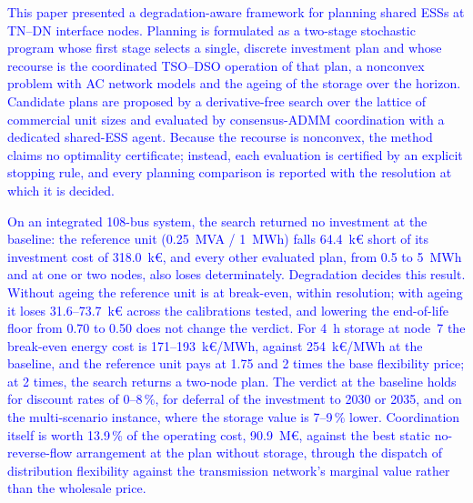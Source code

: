 \textcolor{blue}{
    This paper presented a degradation-aware framework for planning shared ESSs at TN--DN interface nodes. Planning is formulated as a two-stage stochastic program whose first stage selects a single, discrete investment plan and whose recourse is the coordinated TSO--DSO operation of that plan, a nonconvex problem with AC network models and the ageing of the storage over the horizon. Candidate plans are proposed by a derivative-free search over the lattice of commercial unit sizes and evaluated by consensus-ADMM coordination with a dedicated shared-ESS agent. Because the recourse is nonconvex, the method claims no optimality certificate; instead, each evaluation is certified by an explicit stopping rule, and every planning comparison is reported with the resolution at which it is decided.
}

\textcolor{blue}{
    On an integrated 108-bus system, the search returned no investment at the baseline: the reference unit (0.25~MVA / 1~MWh) falls 64.4~k\euro{} short of its investment cost of 318.0~k\euro{}, and every other evaluated plan, from 0.5 to 5~MWh and at one or two nodes, also loses determinately. Degradation decides this result. Without ageing the reference unit is at break-even, within resolution; with ageing it loses 31.6--73.7~k\euro{} across the calibrations tested, and lowering the end-of-life floor from 0.70 to 0.50 does not change the verdict. For 4~h storage at node~7 the break-even energy cost is 171--193~k\euro/MWh, against 254~k\euro/MWh at the baseline, and the reference unit pays at 1.75 and 2 times the base flexibility price; at 2 times, the search returns a two-node plan. The verdict at the baseline holds for discount rates of 0--8\,\%, for deferral of the investment to 2030 or 2035, and on the multi-scenario instance, where the storage value is 7--9\,\% lower. Coordination itself is worth 13.9\,\% of the operating cost, 90.9~M\euro{}, against the best static no-reverse-flow arrangement at the plan without storage, through the dispatch of distribution flexibility against the transmission network's marginal value rather than the wholesale price.
}

